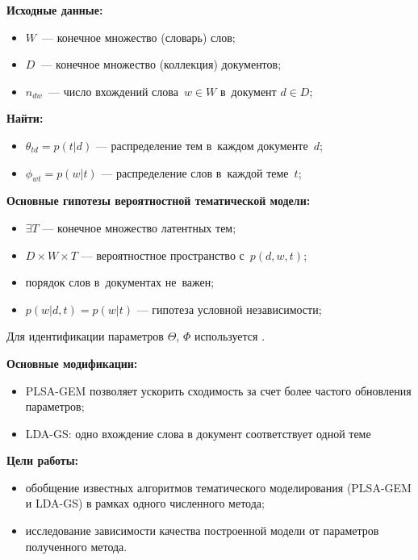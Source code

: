 





\textbf{Исходные данные:}
\begin{itemize}
		\item $W$~--- конечное множество (словарь) слов;
		\item $D$~--- конечное множество (коллекция) документов;
		\item $n_{dw}$~--- число вхождений слова~$w\in W$ в~документ $d\in D$;
\end{itemize}

\textbf{Найти:}
\begin{itemize}
		\item $\theta_{td} = p(t|d)$ --- распределение тем в~каждом документе~$d$;
		\item $\phi_{wt} = p(w|t)$ --- распределение слов в~каждой теме~$t$;
\end{itemize}

\textbf{Основные гипотезы вероятностной тематической модели:}
\begin{itemize}
		\item $\exists{T}$ --- конечное множество латентных тем;
		\item $D\times W\times T$ --- вероятностное пространство с~$p(d,w,t)$;
		\item порядок слов в~документах не~важен;
		\item $p(w|d,t) = p(w|t)$ --- гипотеза условной независимости;
\end{itemize}


Для идентификации параметров $\Theta$, $\Phi$ используется .

\textbf{Основные модификации:}
\begin{itemize}
	\item PLSA-GEM позволяет ускорить сходимость за счет более частого обновления параметров;
	\item LDA-GS: одно вхождение слова в документ соответствует одной теме
\end{itemize}

\textbf{Цели работы:}
\begin{itemize}
	\item обобщение известных алгоритмов тематического моделирования (PLSA-GEM и LDA-GS) в рамках одного численного метода;
	\item исследование зависимости качества построенной модели от параметров полученного метода.
\end{itemize}

